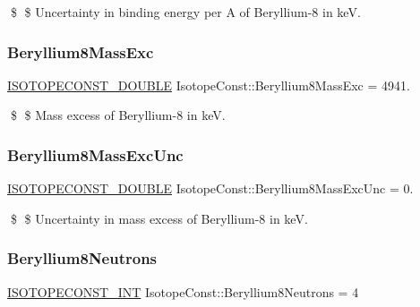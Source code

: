 \$ \$ Uncertainty in binding energy per A of Beryllium-\/8 in keV. \mbox{\label{group___isotope_const-_beryllium-_be8_gaf70c107f9ac29e26f3074a243a3b7ac1}} 
\subsubsection{\texorpdfstring{Beryllium8\+Mass\+Exc}{Beryllium8MassExc}}
{\footnotesize\ttfamily \mbox{\hyperlink{group___isotope_const-_macros_ga8f45a7272ce02c0b4c65c44636ed719a}{I\+S\+O\+T\+O\+P\+E\+C\+O\+N\+S\+T\+\_\+\+D\+O\+U\+B\+LE}} Isotope\+Const\+::\+Beryllium8\+Mass\+Exc = 4941.}

\$ \$ Mass excess of Beryllium-\/8 in keV. \mbox{\label{group___isotope_const-_beryllium-_be8_ga7cdb2252de7f2b7f92a947a6d06309a9}} 
\subsubsection{\texorpdfstring{Beryllium8\+Mass\+Exc\+Unc}{Beryllium8MassExcUnc}}
{\footnotesize\ttfamily \mbox{\hyperlink{group___isotope_const-_macros_ga8f45a7272ce02c0b4c65c44636ed719a}{I\+S\+O\+T\+O\+P\+E\+C\+O\+N\+S\+T\+\_\+\+D\+O\+U\+B\+LE}} Isotope\+Const\+::\+Beryllium8\+Mass\+Exc\+Unc = 0.}

\$ \$ Uncertainty in mass excess of Beryllium-\/8 in keV. \mbox{\label{group___isotope_const-_beryllium-_be8_ga0ece899d72ebfa6de79d0d7805ead65d}} 
\subsubsection{\texorpdfstring{Beryllium8\+Neutrons}{Beryllium8Neutrons}}
{\footnotesize\ttfamily \mbox{\hyperlink{group___isotope_const-_macros_ga5f18360b3e99483a35c32d789e62621c}{I\+S\+O\+T\+O\+P\+E\+C\+O\+N\+S\+T\+\_\+\+I\+NT}} Isotope\+Const\+::\+Beryllium8\+Neutrons = 4}


